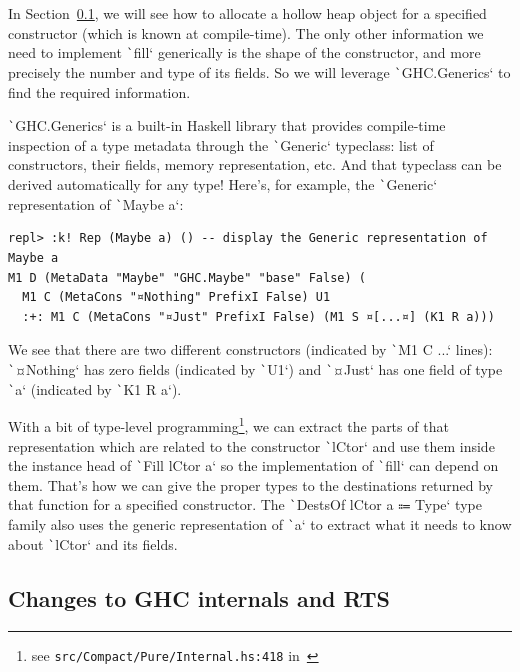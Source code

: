 \documentclass[english]{jflart}
\newlength{\currentparskip}
\newenvironment{unbreakable}
{%
  \setlength{\currentparskip}{\parskip}%
  \setlength{\parskip}{\currentparskip}%
  \par\vspace{0.5\baselineskip}%
  \noindent\begin{minipage}{\textwidth}%
    \setlength{\parskip}{\currentparskip}%
}
{%
  \end{minipage}%
  \par\vspace{0.5\baselineskip}%
}
\begin{document}
In Section~\ref{ssec:impl-ghc}, we will see how to allocate a hollow heap object for a specified constructor (which is known at compile-time). The only other information we need to implement \texttt`fill` generically is the shape of the constructor, and more precisely the number and type of its fields. So we will leverage \texttt`GHC.Generics` to find the required information.

\texttt`GHC.Generics` is a built-in Haskell library that provides compile-time inspection of a type metadata through the \texttt`Generic` typeclass: list of constructors, their fields, memory representation, etc. And that typeclass can be derived automatically for any type! Here's, for example, the \texttt`Generic` representation of \texttt`Maybe a`:

\begin{unbreakable}
{\small
\begin{verbatim}
repl> :k! Rep (Maybe a) () -- display the Generic representation of Maybe a
M1 D (MetaData "Maybe" "GHC.Maybe" "base" False) (
  M1 C (MetaCons "¤Nothing" PrefixI False) U1
  :+: M1 C (MetaCons "¤Just" PrefixI False) (M1 S ¤[...¤] (K1 R a)))
\end{verbatim}
}
\end{unbreakable}

We see that there are two different constructors (indicated by \texttt`M1 C ...` lines): \texttt`¤Nothing` has zero fields (indicated by \texttt`U1`) and \texttt`¤Just` has one field of type \texttt`a` (indicated by \texttt`K1 R a`).

With a bit of type-level programming\footnote{see \texttt{src/Compact/Pure/Internal.hs:418} in~\cite{linear_dest}}, we can extract the parts of that representation which are related to the constructor \texttt`lCtor` and use them inside the instance head of \texttt`Fill lCtor a` so the implementation of \texttt`fill` can depend on them. That's how we can give the proper types to the destinations returned by that function for a specified constructor. The \texttt`DestsOf lCtor a ⩴ Type` type family also uses the generic representation of \texttt`a` to extract what it needs to know about \texttt`lCtor` and its fields.

\subsection{Changes to GHC internals and RTS}\label{ssec:impl-ghc}
\end{document}
